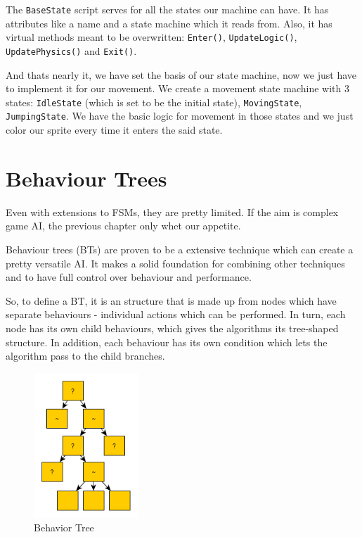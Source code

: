 \documentclass[a4paper, 12pt]{book}
\begin{document}
The \texttt{BaseState} script serves for all the states our machine can have. It has attributes like a name and a state machine which it reads from. Also, it has virtual methods meant to be overwritten: \texttt{Enter()}, \texttt{UpdateLogic()}, \texttt{UpdatePhysics()} and \texttt{Exit()}.

And thats nearly it, we have set the basis of our state machine, now we just have to implement it for our movement. We create a movement state machine with 3 states: \texttt{IdleState} (which is set to be the initial state), \texttt{MovingState}, \texttt{JumpingState}. We have the basic logic for movement in those states and we just color our sprite every time it enters the said state.

\clearpage

\section{Behaviour Trees}

Even with extensions to FSMs, they are pretty limited. If the aim is complex game AI, the previous chapter only whet our appetite.

Behaviour trees (BTs) \cite{BehaviourTreeStarterPack} are proven to be a extensive technique which can create a pretty versatile AI. It makes a solid foundation for combining other techniques and to have full control over behaviour and performance.

So, to define a BT, it is an structure that is made up from nodes which have separate behaviours - individual actions which can be performed. In turn, each node has its own child behaviours, which gives the algorithms its tree-shaped structure. In addition, each behaviour has its own condition which lets the algorithm pass to the child branches.

\begin{figure}[h]
\begin{center}
    \includegraphics[width=0.35\textwidth]{Images/behaviour_tree.png}
\end{center}
\caption{Behavior Tree}
\label{pic3}
\end{figure}
\end{document}
